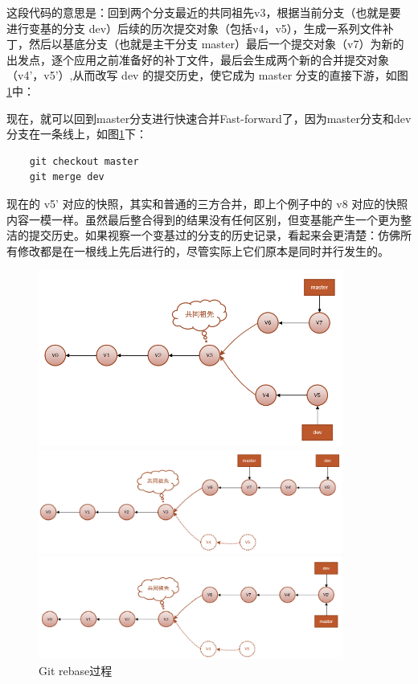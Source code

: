 这段代码的意思是：回到两个分支最近的共同祖先v3，根据当前分支（也就是要进行变基的分支 dev）后续的历次提交对象（包括v4，v5），生成一系列文件补丁，然后以基底分支（也就是主干分支 master）最后一个提交对象（v7）为新的出发点，逐个应用之前准备好的补丁文件，最后会生成两个新的合并提交对象（v4'，v5'）,从而改写 dev 的提交历史，使它成为 master 分支的直接下游，如图\ref{rebase}中：

现在，就可以回到master分支进行快速合并Fast-forward了，因为master分支和dev分支在一条线上，如图\ref{rebase}下：
\begin{lstlisting}
    git checkout master
    git merge dev
\end{lstlisting}

现在的 v5' 对应的快照，其实和普通的三方合并，即上个例子中的 v8 对应的快照内容一模一样。虽然最后整合得到的结果没有任何区别，但变基能产生一个更为整洁的提交历史。如果视察一个变基过的分支的历史记录，看起来会更清楚：仿佛所有修改都是在一根线上先后进行的，尽管实际上它们原本是同时并行发生的。

\begin{figure}[ht]
    \centering
    \begin{minipage}[c]{0.9\textwidth}
        \centering
        \includegraphics[width=10cm]{image/git/git-rebase.png}
    \end{minipage}

    \begin{minipage}[c]{0.9\textwidth}
        \centering
        \includegraphics[width=10cm]{image/git/git-rebase2.png}
    \end{minipage}

    \begin{minipage}[c]{0.9\textwidth}
        \centering
        \includegraphics[width=10cm]{image/git/git-rebase3.png}
    \end{minipage}
    \caption{Git rebase过程}
    \label{rebase}
\end{figure}


